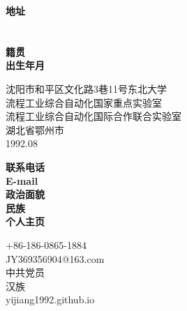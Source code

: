 \documentclass[11pt]{moderncv}
\begin{document}
\begin{CJK*}{UTF8}{gbsn}

 \cnname{\hspace{0.2em}\color{blue}{姜 艺}}
 \maketitle
\vspace{-12mm}

\parbox[t]{2.5cm}{
                \textbf{地址}\\
                \textbf{}\\
                \textbf{}\\
                \textbf{籍贯}\\
                \textbf{出生年月}\\
                \textbf{}}
\parbox[t]{7cm}{沈阳市和平区文化路3巷11号东北大学\\
                流程工业综合自动化国家重点实验室\\
                流程工业综合自动化国际合作联合实验室\\
                湖北省鄂州市\\
                1992.08\\

                }
\parbox[t]{2cm}{
               \textbf{联系电话}\\
               \textbf{E-mail}\\
               \textbf{政治面貌}\\
               \textbf{民族}\\
               \textbf{个人主页}\\
               }
\hspace{.1em}
\parbox[t]{5cm}{
               +86-186-0865-1884\\
               JY369356904@163.com\\
               中共党员\\
               汉族\\
               yijiang1992.github.io\\
               }
\vspace{3mm}

\end{CJK*}
\end{document}
